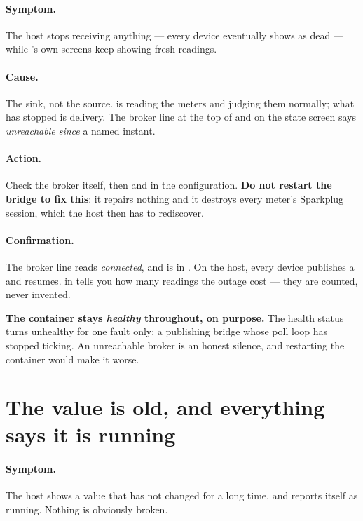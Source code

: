\paragraph{Symptom.} The host stops receiving anything --- every device eventually shows as
dead --- while \prog's own screens keep showing fresh readings.

\paragraph{Cause.} The sink, not the source. \prog is reading the meters and judging them
normally; what has stopped is delivery. The broker line at the top of  and on the
state screen says \emph{unreachable since} a named instant.

\paragraph{Action.} Check the broker itself, then  and
 in the configuration. \textbf{Do not restart the bridge to fix this}: it
repairs nothing and it destroys every meter's Sparkplug session, which the host then has to
rediscover.

\paragraph{Confirmation.} The broker line reads \emph{connected}, and 
is  in . On the host, every device publishes a  and
resumes.  in  tells you how many readings the outage
cost --- they are counted, never invented.

\begin{note}
\textbf{The container stays \emph{healthy} throughout, on purpose.} The health status turns
unhealthy for one fault only: a publishing bridge whose poll loop has stopped ticking. An
unreachable broker is an honest silence, and restarting the container would make it worse.
\end{note}

\section{The value is old, and everything says it is running}
\label{sec:trouble-stale-alive}

\paragraph{Symptom.} The host shows a value that has not changed for a long time, and \prog
reports itself as running. Nothing is obviously broken.

